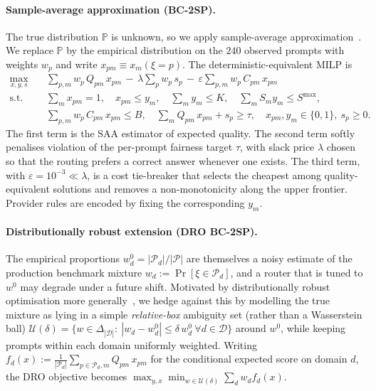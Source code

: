 \documentclass[11pt]{article}
\newcommand{\pP}{\mathcal{P}}\newcommand{\pM}{\mathcal{M}}
\newcommand{\pD}{\mathcal{D}}\newcommand{\pU}{\mathcal{U}}
\begin{document}
\paragraph{Sample-average approximation (BC-2SP).}
The true distribution $\mathbb{P}$ is unknown, so we apply sample-average
approximation~\citep{shapiro2021lectures}. We replace $\mathbb{P}$ by the
empirical distribution on the $240$ observed prompts with weights $w_p$ and
write $x_{pm}\equiv x_m(\xi=p)$. The deterministic-equivalent MILP is
\begin{align}
\max_{x,y,s}\quad
& \sum_{p,m}\! w_p\,Q_{pm}\,x_{pm}
\,-\,\lambda\sum_p w_p\, s_p
\,-\,\varepsilon\sum_{p,m}\! w_p\,C_{pm}\,x_{pm}
\label{eq:saa}\\[-1pt]
\text{s.t.}\quad
& \textstyle\sum_m x_{pm}=1,\quad x_{pm}\le y_m, \quad \sum_m y_m\le K,
\quad \sum_m S_m y_m\le S^{\max},\nonumber\\[-1pt]
& \textstyle\sum_{p,m}\! w_p\,C_{pm}\,x_{pm}\le B,\quad
  \sum_m Q_{pm}\,x_{pm}+s_p\ge \tau,\quad
  x_{pm},y_m\in\{0,1\},\ s_p\ge 0.\nonumber
\end{align}
The first term is the SAA estimator of expected quality. The second term
softly penalises violation of the per-prompt fairness target $\tau$, with
slack price $\lambda$ chosen so that the routing prefers a correct answer
whenever one exists. The third term, with $\varepsilon=10^{-3}\!\ll\!\lambda$,
is a cost tie-breaker that selects the cheapest among quality-equivalent
solutions and removes a non-monotonicity along the upper frontier. Provider
rules are encoded by fixing the corresponding $y_m$.

\paragraph{Distributionally robust extension (DRO BC-2SP).}
The empirical proportions $w_d^{0}=|\pP_d|/|\pP|$ are themselves a noisy
estimate of the production benchmark mixture
$w_d:=\Pr[\xi\in\pP_d]$, and a router that is tuned to $w^{0}$ may degrade
under a future shift. Motivated by distributionally robust
optimisation more generally~\citep{esfahani2018data}, we hedge against
this by modelling the true mixture as lying in a simple
\emph{relative-box} ambiguity set (rather than a Wasserstein ball)
$\pU(\delta)=\{w\in\Delta_{|\pD|}:\ |w_d-w_d^{0}|\le \delta\,w_d^{0}\ \forall d\in\pD\}$
around $w^{0}$, while keeping prompts within each domain uniformly
weighted. Writing $f_d(x):=\tfrac{1}{|\pP_d|}\sum_{p\in\pP_d,m} Q_{pm}\,x_{pm}$
for the conditional expected score on domain $d$, the DRO objective becomes
$\max_{y,x}\min_{w\in\pU(\delta)}\sum_d w_d f_d(x)$.
\end{document}
